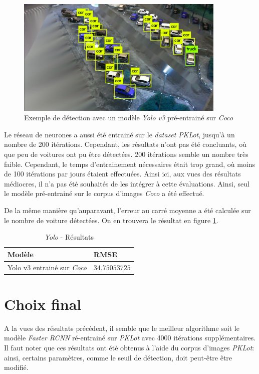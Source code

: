 \begin{figure}[ht]
    \includegraphics[width=10cm]{img/tests/yolo_bb.png}
    \centering
    \caption{Exemple de détection avec un modèle \textit{Yolo v3} pré-entrainé sur \textit{Coco}}
    \label{fig:yolo_bb}
\end{figure} 

Le réseau de neurones a aussi été entrainé sur le \textit{dataset} \textit{PKLot}, jusqu'à un nombre de 200 itérations. Cependant, les résultats n'ont pas été concluants, où que peu de voitures ont pu être détectées. 200 itérations semble un nombre très faible. Cependant, le temps d'entrainement nécessaires était trop grand, où moins de 100 itérations par jours étaient effectuées. Ainsi ici, aux vues des résultats médiocres, il n'a pas été souhaités de les intégrer à cette évaluations. Ainsi, seul le modèle pré-entrainé sur le corpus d'images \textit{Coco} a été effectué. 

De la même manière qu'auparavant, l'erreur au carré moyenne a été calculée sur le nombre de voiture détectées. On en trouvera le résultat en figure \ref{tab:yolo_results}.

\begin{table}[ht]
\centering
\begin{tabular}{@{}ll@{}}
\toprule
Modèle & RMSE \\ \midrule
Yolo v3 entrainé sur \textit{Coco}  & $34.75053725$ \\ \bottomrule
\end{tabular}
\caption{\textit{Yolo} - Résultats}
\label{tab:yolo_results}
\end{table}

\section{Choix final} \label{tests.final}

A la vues des résultats précédent, il semble que le meilleur algorithme soit le modèle \textit{Faster RCNN} ré-entrainé sur \textit{PKLot} avec 4000 itérations supplémentaires. Il faut noter que ces résultats ont été obtenus à l'aide du corpus d'images \textit{PKLot}: ainsi, certains paramètres, comme le seuil de détection, doit peut-être être modifié. 


